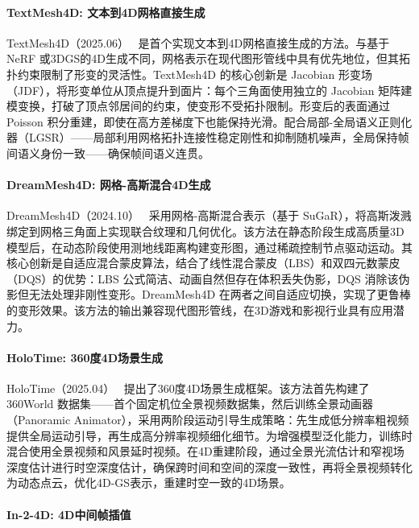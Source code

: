 \paragraph{TextMesh4D: 文本到4D网格直接生成}

TextMesh4D（2025.06）~\cite{2506_24121} 是首个实现文本到4D网格直接生成的方法。与基于 NeRF 或3DGS的4D生成不同，网格表示在现代图形管线中具有优先地位，但其拓扑约束限制了形变的灵活性。TextMesh4D 的核心创新是 Jacobian 形变场（JDF），将形变单位从顶点提升到面片：每个三角面使用独立的 Jacobian 矩阵建模变换，打破了顶点邻居间的约束，使变形不受拓扑限制。形变后的表面通过 Poisson 积分重建，即使在高方差梯度下也能保持光滑。配合局部-全局语义正则化器（LGSR）——局部利用网格拓扑连接性稳定刚性和抑制随机噪声，全局保持帧间语义身份一致——确保帧间语义连贯。

\paragraph{DreamMesh4D: 网格-高斯混合4D生成}

DreamMesh4D（2024.10）~\cite{2410_06756} 采用网格-高斯混合表示（基于 SuGaR），将高斯泼溅绑定到网格三角面上实现联合纹理和几何优化。该方法在静态阶段生成高质量3D模型后，在动态阶段使用测地线距离构建变形图，通过稀疏控制节点驱动运动。其核心创新是自适应混合蒙皮算法，结合了线性混合蒙皮（LBS）和双四元数蒙皮（DQS）的优势：LBS 公式简洁、动画自然但存在体积丢失伪影，DQS 消除该伪影但无法处理非刚性变形。DreamMesh4D 在两者之间自适应切换，实现了更鲁棒的变形效果。该方法的输出兼容现代图形管线，在3D游戏和影视行业具有应用潜力。

\paragraph{HoloTime: 360度4D场景生成}

HoloTime（2025.04）~\cite{2504_21650} 提出了360度4D场景生成框架。该方法首先构建了 360World 数据集——首个固定机位全景视频数据集，然后训练全景动画器（Panoramic Animator），采用两阶段运动引导生成策略：先生成低分辨率粗视频提供全局运动引导，再生成高分辨率视频细化细节。为增强模型泛化能力，训练时混合使用全景视频和风景延时视频。在4D重建阶段，通过全景光流估计和窄视场深度估计进行时空深度估计，确保跨时间和空间的深度一致性，再将全景视频转化为动态点云，优化4D-GS表示，重建时空一致的4D场景。

\paragraph{In-2-4D: 4D中间帧插值}

